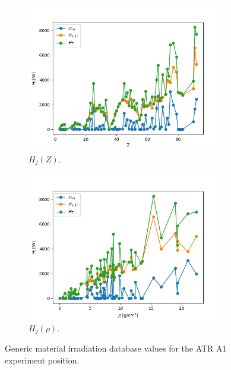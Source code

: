 \begin{figure}[htbp!] %
  \centering
  \begin{subfigure}[b]{0.49\textwidth}
    \centering
    \includegraphics[width=0.95\textwidth]{figures/data-H_Z}
    \caption{$H_j(Z)$.}
  \end{subfigure}
  \hfill
  \begin{subfigure}[b]{0.49\textwidth}
    \centering
    \includegraphics[width=0.95\textwidth]{figures/data-H_rho}
    \caption{$H_j(\rho)$.}
  \end{subfigure}
  \hfill
  \caption{Generic material irradiation database values for the ATR A1 experiment position.}
  \label{fig:atr-data}
\end{figure}

